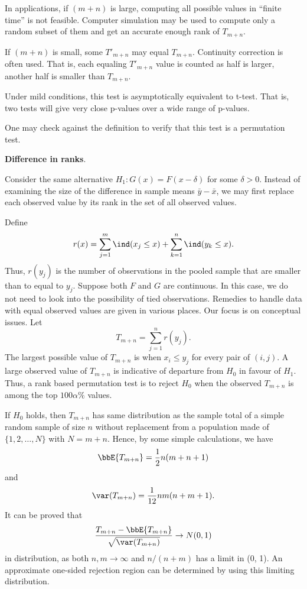 In applications, if $(m+n)$ is large, computing all possible values
in ``finite time'' is not feasible. 
Computer simulation may be used to compute only
a random subset of them and get an accurate enough rank of
$T_{m+n}$.

If $(m+n)$ is small, some $T'_{m+n}$ may equal $T_{m+n}$.
Continuity correction is often used. That is, each equaling
$T'_{m+n}$ value is counted as half is larger, another half
is smaller than $T_{m+n}$.

Under mild conditions, this test is asymptotically equivalent to t-test.
That is, two tests will give very close p-values over a wide
range of p-values.

One may check against the definition to verify that this
test is a permutation test.

\vs
\noindent
{\bf Difference in ranks}.

Consider the same alternative $H_1: G(x) = F(x - \delta)$
for some $\delta > 0$. Instead of examining the size of
the difference in sample means $\bar y - \bar x$,
we may first replace each observed value by its rank
in the set of all observed values.

Define
\[
r(x) = \sum_{j=1}^m \ind (x_j \leq x) + \sum_{k=1}^n \ind (y_k \leq x).
\]
Thus, $r(y_j)$ is the number of observations in the pooled
sample that are smaller than to equal to $y_j$. 
Suppose both $F$ and $G$ are continuous.
In this case, we do not need to look into the possibility of tied observations.
Remedies to handle data with equal observed values are given in
various places. Our focus is on conceptual issues.
Let
\[
T_{m+n} = \sum_{j=1}^n r(y_j).
\]
The largest possible value of $T_{m+n}$ is when
$x_i \leq y_j$ for every pair of $(i, j)$. A large observed
value of $T_{m+n}$ is indicative of departure from $H_0$
in favour of $H_1$. 
Thus, a rank based permutation test is to reject $H_0$
when the observed $T_{m+n}$ is among the
top $100\alpha\%$ values. 

If $H_0$ holds, then $T_{m+n}$ has same distribution
as the sample total of a simple random sample 
of size $n$ without replacement
from a population made of $\{1, 2, \ldots, N\}$ with $N = m+n$.
Hence, by some simple calculations, we have
\[
\bbE \{T_{m+n}\} = \frac{1}{2}n (m+n+1)
\]
and
\[
\var ( T_{m+n}) 
=
\frac{1}{12} nm(n+m+1).
\]
It can be proved that 
\[
\frac{ T_{m+n} - \bbE \{T_{m+n}\}}{\sqrt{\var ( T_{m+n}) }} \to N(0, 1)
\]
in distribution,
as both $n, m \to \infty$ and $n/(n+m)$ has a limit in (0, 1).
An approximate one-sided rejection region can be determined
by using this limiting distribution.

